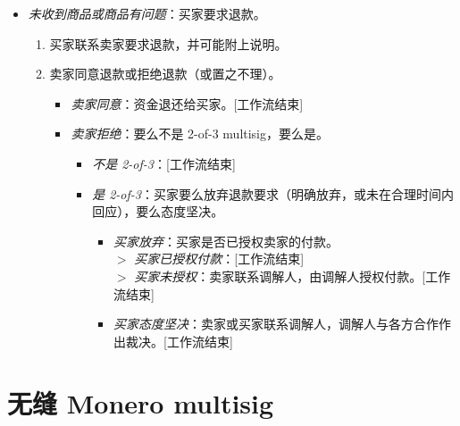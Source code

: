 \begin{enumerate}
\begin{itemize}
\begin{itemize}
\begin{itemize}
\begin{enumerate}
\begin{itemize}
                        $>$ {\em 买家要求退款}：进入"问题商品"工作流。
                        \item {\em 买家不回应}：卖家请求调解人帮助释放资金。[工作流结束]
                    \end{itemize}{}
                \end{enumerate}{}
            \end{itemize}{}
        \end{itemize}{}
        \item {\em 未收到商品或商品有问题}：买家要求退款。
        \begin{enumerate}
            \item 买家联系卖家要求退款，并可能附上说明。
            \item 卖家同意退款或拒绝退款（或置之不理）。
            \begin{itemize}
                \item {\em 卖家同意}：资金退还给买家。[工作流结束]
                \item {\em 卖家拒绝}：要么不是 2-of-3 multisig，要么是。
                \begin{itemize}
                    \item {\em 不是 2-of-3}：[工作流结束]
                    \item {\em 是 2-of-3}：买家要么放弃退款要求（明确放弃，或未在合理时间内回应），要么态度坚决。
                    \begin{itemize}
                        \item {\em 买家放弃}：买家是否已授权卖家的付款。\\
                        $>$ {\em 买家已授权付款}：[工作流结束]\\
                        $>$ {\em 买家未授权}：卖家联系调解人，由调解人授权付款。[工作流结束]
                        \item {\em 买家态度坚决}：卖家或买家联系调解人，调解人与各方合作作出裁决。[工作流结束]
                    \end{itemize}{}
                \end{itemize}{}
            \end{itemize}{}
        \end{enumerate}{}
    \end{itemize}{}
\end{enumerate}{}



\section{无缝 Monero multisig}
\label{sec:escrowed-marketplace-seamless-multisig}

